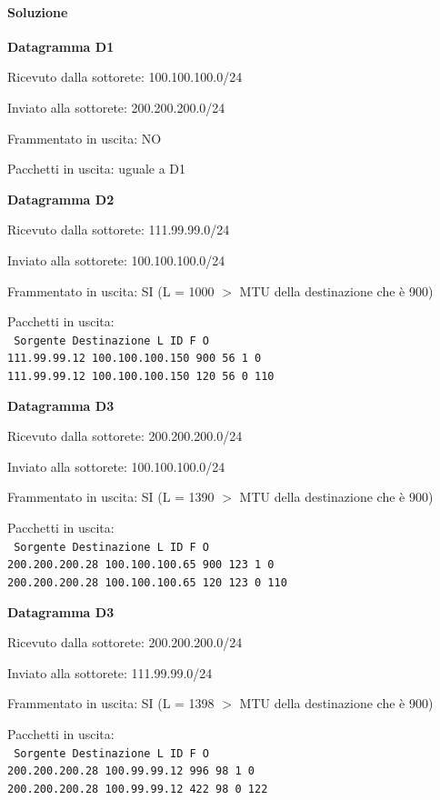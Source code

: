 \documentclass[10pt]{article}
\begin{document}
{\paragraph{Soluzione}
\begin{list}{}{}
\item \textbf{Datagramma D1}
	\begin{list}{-}{}
	\item Ricevuto dalla sottorete: 100.100.100.0/24
	\item Inviato alla sottorete: 200.200.200.0/24
	\item Frammentato in uscita: NO
	\item Pacchetti in uscita: uguale a D1
	\end{list}
\item \textbf{Datagramma D2}
	\begin{list}{-}{}
	\item Ricevuto dalla sottorete: 111.99.99.0/24
	\item Inviato alla sottorete: 100.100.100.0/24
	\item Frammentato in uscita: SI (L = 1000 $>$ MTU della destinazione che è 900)
	\item Pacchetti in uscita:\\
		\texttt{  Sorgente      Destinazione      L    ID    F    O}\\
		\texttt{111.99.99.12   100.100.100.150   900   56    1    0}\\
		\texttt{111.99.99.12   100.100.100.150   120   56    0  110}
	\end{list}
\item \textbf{Datagramma D3}
	\begin{list}{-}{}
	\item Ricevuto dalla sottorete: 200.200.200.0/24
	\item Inviato alla sottorete: 100.100.100.0/24
	\item Frammentato in uscita: SI (L = 1390 $>$ MTU della destinazione che è 900)
	\item Pacchetti in uscita:\\
		\texttt{  Sorgente      Destinazione      L    ID    F    O}\\
		\texttt{200.200.200.28   100.100.100.65   900   123    1    0}\\
		\texttt{200.200.200.28   100.100.100.65   120   123    0  110}
	\end{list}
\item \textbf{Datagramma D3}
	\begin{list}{-}{}
	\item Ricevuto dalla sottorete: 200.200.200.0/24
	\item Inviato alla sottorete: 111.99.99.0/24
	\item Frammentato in uscita: SI (L = 1398 $>$ MTU della destinazione che è 900)
	\item Pacchetti in uscita:\\
		\texttt{  Sorgente      Destinazione      L    ID    F    O}\\
		\texttt{200.200.200.28   100.99.99.12   996   98    1    0}\\
		\texttt{200.200.200.28   100.99.99.12   422   98    0  122}
	\end{list}
\end{list}
}
\end{document}
